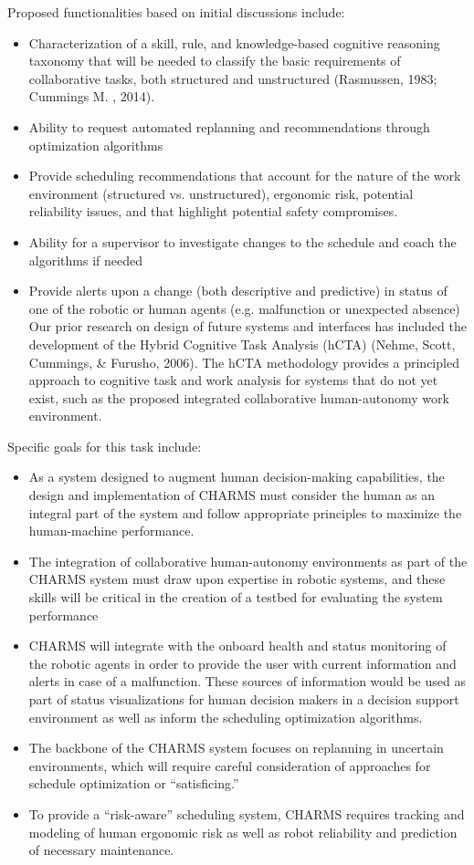 Proposed functionalities based on initial discussions include:
\begin{itemize}
\item Characterization of a skill, rule, and knowledge-based cognitive reasoning taxonomy that will be needed to classify the basic requirements of collaborative tasks, both structured and unstructured (Rasmussen, 1983; Cummings M. , 2014).
\item Ability to request automated replanning and recommendations through optimization algorithms
\item Provide scheduling recommendations that account for the nature of the work environment (structured vs. unstructured), ergonomic risk, potential reliability issues, and that highlight potential safety compromises.
\item Ability for a supervisor to investigate changes to the schedule and coach the algorithms if needed
\item Provide alerts upon a change (both descriptive and predictive) in status of one of the robotic or human agents (e.g. malfunction or unexpected absence)
Our prior research on design of future systems and interfaces has included the development of the Hybrid Cognitive Task Analysis (hCTA) (Nehme, Scott, Cummings, \& Furusho, 2006). The hCTA methodology provides a principled approach to cognitive task and work analysis for systems that do not yet exist, such as the proposed integrated collaborative human-autonomy work environment. 
\end{itemize}

Specific goals for this task include: 
\begin{itemize}
    \item As a system designed to augment human decision-making capabilities, the design and implementation of CHARMS must consider the human as an integral part of the system and follow appropriate principles to maximize the human-machine performance. 
    \item The integration of collaborative human-autonomy environments as part of the CHARMS system must draw upon expertise in robotic systems, and these skills will be critical in the creation of a testbed for evaluating the system performance
    \item CHARMS will integrate with the onboard health and status monitoring of the robotic agents in order to provide the user with current information and alerts in case of a malfunction. These sources of information would be used as part of status visualizations for human decision makers in a decision support environment as well as inform the scheduling optimization algorithms. 
    \item The backbone of the CHARMS system focuses on replanning in uncertain environments, which will require careful consideration of approaches for schedule optimization or ``satisficing.''
    \item To provide a ``risk-aware'' scheduling system, CHARMS requires tracking and modeling of human ergonomic risk as well as robot reliability and prediction of necessary maintenance.
\end{itemize}

